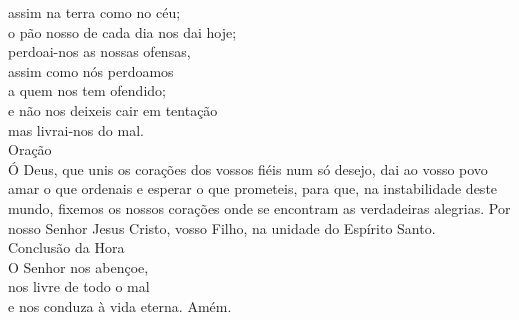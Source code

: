 \documentclass{book}
\begin{document}
\begin{center}
    assim na terra como no céu; \\
    o pão nosso de cada dia nos dai hoje; \\
    perdoai-nos as nossas ofensas, \\
    assim como nós perdoamos \\
    a quem nos tem ofendido; \\
    e não nos deixeis cair em tentação \\
    mas livrai-nos do mal.
    \vspace{.2cm} \\
    \textcolor{VioletRed2}{Oração}
    \vspace{.2cm} \\
    Ó Deus, que unis os corações dos vossos fiéis num só desejo, dai ao vosso povo amar o que ordenais e esperar o que prometeis, para que, na instabilidade deste mundo, fixemos os nossos corações onde se encontram as verdadeiras alegrias. Por nosso Senhor Jesus Cristo, vosso Filho, na unidade do Espírito Santo.
    \vspace{.2cm} \\
    \textcolor{VioletRed2}{Conclusão da Hora}
    \vspace{.2cm} \\
    O Senhor nos abençoe, \\
    nos livre de todo o mal \\
    e nos conduza à vida eterna. Amém.
\end{center}
\end{document}
